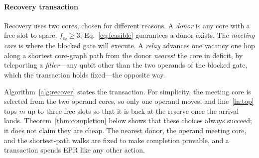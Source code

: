 \documentclass[journal]{IEEEtran}
\begin{document}
\paragraph*{Recovery transaction}
Recovery uses two cores, chosen for different reasons. A \emph{donor} is any core with a free slot to spare, $f_{c_d}\ge3$; Eq.~\eqref{eq:feasible} guarantees a donor exists. The \emph{meeting core} is where the blocked gate will execute. A \emph{relay} advances one vacancy one hop along a shortest core-graph path from the donor \emph{nearest} the core in deficit, by teleporting a \emph{filler}---any qubit other than the two operands of the blocked gate, which the transaction holds fixed---the opposite way.


Algorithm~\ref{alg:recover} states the transaction. For simplicity, the meeting core is selected from the two operand cores, so only one operand moves, and line~\ref{ln:top} tops $m$ up to three free slots so that it is back at the reserve once the arrival lands. Theorem~\ref{thm:completion} below shows that these choices always succeed; it does not claim they are cheap. The nearest donor, the operand meeting core, and the shortest-path walks are fixed to make completion provable, and a transaction spends EPR like any other action.
\end{document}
